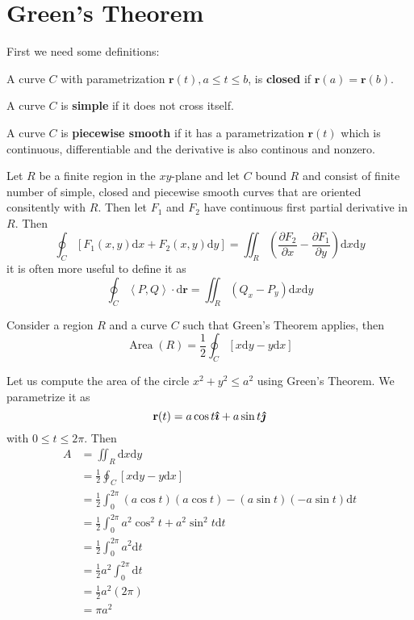 \section{Green's Theorem}
First we need some definitions:
\begin{definition}
	A curve $C$ with parametrization $\mathbf{r}(t), a \leq t \leq b$, is \textbf{closed} if $\mathbf{r}(a)= \mathbf{r}(b)$.
\end{definition}
\begin{definition}
	A curve $C$ is \textbf{simple} if it does not cross itself.
\end{definition}
\begin{definition}
	A curve $C$ is \textbf{piecewise smooth} if it has a parametrization $\mathbf{r}(t)$ which is continuous, differentiable and the derivative is also continous and nonzero.
\end{definition}
\begin{theorem}
	Let $R$ be a finite region in the $xy$-plane and let $C$ bound $R$ and consist of finite number of simple, closed and piecewise smooth curves that are oriented consitently with $R$. Then let $F_1$ and $F_2$ have continuous first partial derivative in $R$. Then
	\[
		\oint_C \left[ F_1(x,y)\mathrm{d}x + F_2(x,y)\mathrm{d}y \right]  = \iint_R \left( \frac{\partial F_2}{\partial x} - \frac{\partial F_1}{\partial y}  \right) \mathrm{d}x\mathrm{d}y
	\]
	it is often more useful to define it as
	\[
		\oint_C \left\langle P, Q \right\rangle \cdot \mathrm{d}\mathbf{r} = \iint_R \left(  Q_x - P_y \right)\mathrm{d}x\mathrm{d}y
	\] 
\end{theorem}
\begin{corollary}
	Consider a region $R$ and a curve $C$ such that Green's Theorem applies, then
	 \[
		 \operatorname{Area}(R) = \frac{1}{2}\oint_C \left[ x\mathrm{d}y - y\mathrm{d}x\right] 
	 \] 
\end{corollary}
\begin{eg}
	Let us compute the area of the circle $x^{2}+y^2 \leq a^{2}$ using Green's Theorem. We parametrize it as
	\[
		\mathbf{r}(t) = a\cos t \bm {\hat \imath} + a\sin t \bm {\hat \jmath}
	\] 
	with $0\leq t \leq 2\pi$. Then
	\begin{align*}
		A &= \iint_R \mathrm{d}x\mathrm{d}y\\&=  \frac{1}{2}\oint_C \left[ x\mathrm{d}y - y\mathrm{d}x \right]\\
		  &= \frac{1}{2} \int_{0}^{2\pi} (a\cos t)(a \cos t) - (a\sin t)(-a\sin t) \mathrm{d}t\\
		  &=\frac{1}{2} \int_{0}^{2\pi} a^{2} \cos^{2} t + a^{2}\sin^{2}t \mathrm{d}t\\
		  &=\frac{1}{2} \int_{0}^{2\pi} a^{2} \mathrm{d}t\\
		  &= \frac{1}{2} a^{2} \int_{0}^{2\pi}  \mathrm{d}t\\
		  &= \frac{1}{2}a^{2}(2\pi)\\
		  &= \pi a^{2}
	\end{align*}
\end{eg}
